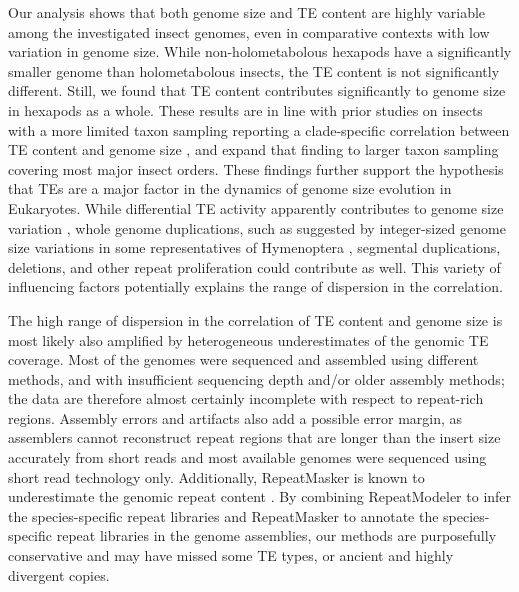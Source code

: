 Our analysis shows that both genome size and TE content are highly
variable among the investigated insect genomes, even in comparative
contexts with low variation in genome size. While non-holometabolous
hexapods have a significantly smaller genome than holometabolous
insects, the TE content is not significantly different. Still, we found
that TE content contributes significantly to genome size in hexapods as
a whole. These results are in line with prior studies on insects with a
more limited taxon sampling reporting a clade-specific correlation
between TE content and genome size
\citep{Vieira1999,Vieira2002,Kidwell2000,Honeybee2006,Bosco2007,Sessegolo2016},
and expand that finding to larger taxon sampling covering most major
insect orders.  These findings further support the hypothesis that TEs
are a major factor in the dynamics of genome size evolution in
Eukaryotes. While differential TE activity apparently contributes to
genome size variation \citep{Petrov2001,Kidwell2002,Agren2011}, whole
genome duplications, such as suggested by integer-sized genome size
variations in some representatives of Hymenoptera \citep{Li2018},
segmental duplications, deletions, and other repeat proliferation
\citep{Parfrey2008} could contribute as well.  This variety of
influencing factors potentially explains the range of dispersion in the
correlation.

The high range of dispersion in the correlation of TE content and genome
size is most likely also amplified by heterogeneous underestimates of
the genomic TE coverage. Most of the genomes were sequenced and
assembled using different methods, and with insufficient sequencing
depth and/or older assembly methods; the data are therefore almost
certainly incomplete with respect to repeat-rich regions. Assembly
errors and artifacts also add a possible error margin, as assemblers
cannot reconstruct repeat regions that are longer than the insert size
accurately from short reads
\citep{Schatz2010,Sambaturu2014,Chaisson2015,Peona2018} and most
available genomes were sequenced using short read technology only.
Additionally, RepeatMasker is known to underestimate the genomic repeat
content \citep{deKoning2011}. By combining RepeatModeler to infer the
species-specific repeat libraries and RepeatMasker to annotate the
species-specific repeat libraries in the genome assemblies, our methods
are purposefully conservative and may have missed some TE types, or
ancient and highly divergent copies.

